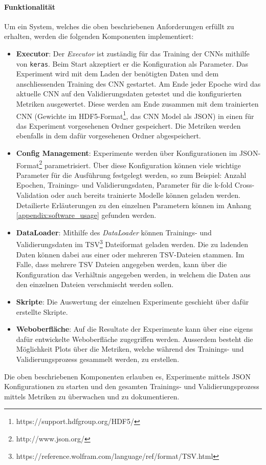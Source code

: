 \paragraph{Funktionalität}
\label{technical_setup:functionality}
Um ein System, welches die oben beschriebenen Anforderungen erfüllt zu erhalten, werden die folgenden Komponenten implementiert:

\begin{itemize}
	\item \textbf{Executor}: Der \emph{Executor} ist zuständig für das Training der CNNs mithilfe von \texttt{keras}. Beim Start akzeptiert er die Konfiguration als Parameter. Das Experiment wird mit dem Laden der benötigten Daten und dem anschliessenden Training des CNN gestartet. Am Ende jeder Epoche wird das aktuelle CNN auf den Validierungsdaten getestet und die konfigurierten Metriken ausgewertet. Diese werden am Ende zusammen mit dem trainierten CNN (Gewichte im HDF5-Format\footnote{https://support.hdfgroup.org/HDF5/}, das CNN Model als JSON) in einen für das Experiment vorgesehenen Ordner gespeichert. Die Metriken werden ebenfalls in dem dafür vorgesehenen Ordner abgespeichert.
	\item \textbf{Config Management}: Experimente werden über Konfigurationen im JSON-Format\footnote{http://www.json.org/} parametrisiert. Über diese Konfiguration können viele wichtige Parameter für die Ausführung festgelegt werden, so zum Beispiel: Anzahl Epochen, Trainings- und Validierungsdaten, Parameter für die k-fold Cross-Validation oder auch bereits trainierte Modelle können geladen werden. Detailierte Erläuterungen zu den einzelnen Parametern können im Anhang \ref{appendix:software_usage} gefunden werden.
	\item \textbf{DataLoader}: Mithilfe des \emph{DataLoader} können Trainings- und Validierungsdaten im TSV\footnote{https://reference.wolfram.com/language/ref/format/TSV.html} Dateiformat geladen werden. Die zu ladenden Daten können dabei aus einer oder mehreren TSV-Dateien stammen. Im Falle, dass mehrere TSV Dateien angegeben werden, kann über die Konfiguration das Verhältnis angegeben werden, in welchem die Daten aus den einzelnen Dateien verschmischt werden sollen.
	\item \textbf{Skripte}: Die Auswertung der einzelnen Experimente geschieht über dafür erstellte Skripte.
	\item \textbf{Weboberfläche}: Auf die Resultate der Experimente kann über eine eigens dafür entwickelte Weboberfläche zugegriffen werden. Ausserdem besteht die Möglichkeit Plots über die Metriken, welche während des Trainings- und Validierungsprozess gesammelt werden, zu erstellen.
	
\end{itemize}
Die oben beschriebenen Komponenten erlauben es, Experimente mittels JSON Konfigurationen zu starten und den gesamten Trainings- und Validierungsprozess mittels Metriken zu überwachen und zu dokumentieren.

